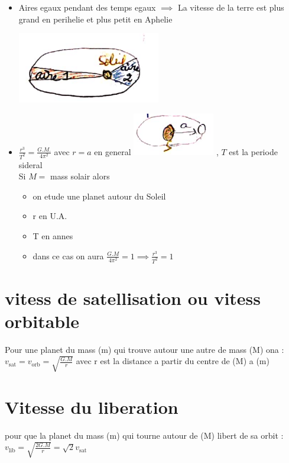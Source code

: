 \documentclass[12pt]{book}
\begin{document}
\begin{itemize}
\begin{minipage}{0.2\linewidth}
                \end{minipage}
            \item 
                \begin{minipage}{0.79\linewidth}
                    Aires egaux pendant des temps egaux $ \implies $ La vitesse de la terre est plus grand en perihelie et plus petit en Aphelie
                \end{minipage}
                \begin{minipage}{0.2\linewidth}
                    \includegraphics[width=\linewidth]{pic/kepler3.png}
                \end{minipage}
            \item $ \frac{r^3}{T^2} = \frac{G.M.}{4\pi^2} $ avec $ r = a $ en general \includegraphics[width =0.2\linewidth]{pic/kepler4.png} , $T$ est la periode sideral\\
                Si $ M =$ mass solair alors \begin{itemize}
                    \item on etude une planet autour du Soleil
                    \item r en U.A.
                    \item T en annes
                    \item dans ce cas on aura $ \frac{G.M}{4\pi^2}= 1 \implies \frac{r^3}{T^2} = 1 $
                \end{itemize}
        \end{itemize}
        \section*{vitess de satellisation ou vitess orbitable}
            Pour une planet du mass (m) qui trouve autour une autre de mass (M) ona : $ v_\text{sat} = v_\text{orb} =\sqrt{\frac{G.M}{r}} $ avec r est la distance a partir du centre de (M) a (m)
        \section*{Vitesse du liberation}
            pour que la planet du mass (m) qui tourne autour de (M) libert de sa orbit : $ v_\text{lib} = \sqrt{\frac{2G.M}{r}} = \sqrt{2}v_\text{sat} $


        
        
\end{document}
